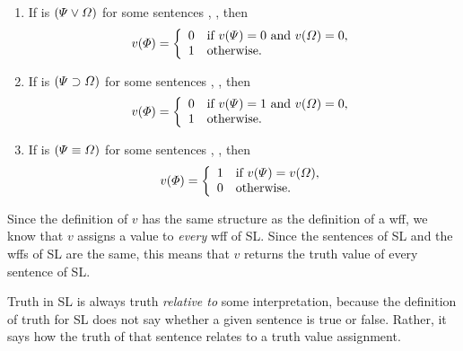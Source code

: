 \begin{enumerate}
\item If \metaA{} is $(\varPsi{}\vee\varOmega{})$ for some sentences \metaB{}, \metaC{}, then
\begin{displaymath}v(\varPhi{}) =
	\left\{\begin{array}{ll}
	0 & \mbox{if $v(\varPsi{}) = 0$ and $v(\varOmega{}) = 0$,}\\
	1 & \mbox{otherwise.}
	\end{array}\right.
\end{displaymath}
\item If \metaA{} is $(\varPsi{}\supset\varOmega{})$ for some sentences \metaB{}, \metaC{}, then
\begin{displaymath}v(\varPhi{}) =
	\left\{\begin{array}{ll}
	0 & \mbox{if $v(\varPsi{}) = 1$ and $v(\varOmega{}) = 0$,}\\
	1 & \mbox{otherwise.}
	\end{array}\right.
\end{displaymath}

\item If \metaA{} is $(\varPsi{}\equiv\varOmega{})$ for some sentences \metaB{}, \metaC{}, then
\begin{displaymath}v(\varPhi{}) =
	\left\{\begin{array}{ll}
	1 & \mbox{if $v(\varPsi{}) = v(\varOmega{})$},\\
	0 & \mbox{otherwise.}
	\end{array}\right.
\end{displaymath}
\end{enumerate}

Since the definition of $v$ has the same structure as the definition of a wff, we know that $v$ assigns a value to \emph{every} wff of SL. Since the sentences of SL and the wffs of SL are the same, this means that $v$ returns the truth value of every sentence of SL.

Truth in SL is always truth \emph{relative to} some interpretation, because the definition of truth for SL does not say whether a given sentence is true or false. Rather, it says how the truth of that sentence relates to a truth value assignment.


